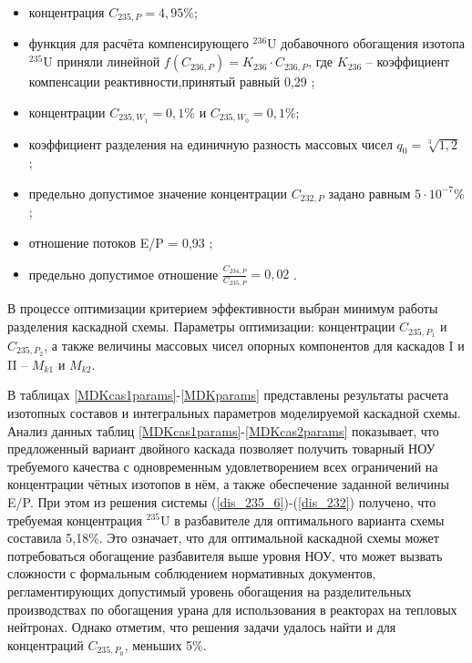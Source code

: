 \begin{itemize}
    \item концентрация $C_{235,{P}} = {4,95\%}$; 
    \item функция для расчёта компенсирующего $^{236}$U добавочного обогащения изотопа $^{235}$U приняли линейной $f(C_{236,P}) = {K_{236}\cdot{C_{236,{P}}}}$, где $K_{236}$ -- коэффициент компенсации реактивности,принятый равный 0,29 \cite{smirnovEvolutionIsotopicComposition2012};
    \item концентрации $C_{235,{W_1}} = 0,1\%$ и $C_{235,{W_0}} = 0,1\%$;
    \item коэффициент разделения на единичную разность массовых чисел $q_{0} = \sqrt[3]{1,2}$ \cite{smirnovEvolutionIsotopicComposition2012};
    \item предельно допустимое значение концентрации $C_{232,{P}}$ задано равным $5\cdot10^{-7} \%$;
    \item отношение потоков E/P = 0,93 \cite{smirnovObogashchenieRegenerirovannogoUrana2018};
    \item предельно допустимое отношение $\frac{C_{234,{P}}}{C_{235,{P}}} = 0,02$ \cite{smirnovObogashchenieRegenerirovannogoUrana2018}. 
\end{itemize}

В процессе оптимизации критерием эффективности выбран минимум работы разделения каскадной схемы. Параметры оптимизации: концентрации $C_{235,{P_1}}$ и $C_{235,{P_2}}$, а также величины массовых чисел опорных компонентов для каскадов I и II -- $M_{k1}$ и $M_{k2}$. 

В таблицах \ref{MDKcas1params}-\ref{MDKparams} представлены результаты расчета изотопных составов и интегральных параметров моделируемой каскадной схемы. Анализ данных таблиц \ref{MDKcas1params}-\ref{MDKcas2params} показывает, что предложенный вариант двойного каскада позволяет получить товарный НОУ требуемого качества с одновременным удовлетворением всех ограничений на концентрации чётных изотопов в нём, а также обеспечение заданной величины E/P. При этом из решения системы (\ref{dis_235_6})-(\ref{dis_232}) получено, что требуемая концентрация $^{235}$U в разбавителе для оптимального варианта схемы составила 5,18\%. Это означает, что для оптимальной каскадной схемы может потребоваться обогащение разбавителя выше уровня НОУ, что может вызвать сложности с формальным соблюдением нормативных документов, регламентирующих допустимый уровень обогащения на разделительных производствах по обогащения урана для использования в реакторах на тепловых нейтронах. Однако отметим, что решения задачи удалось найти и для концентраций $C_{235,{P_0}}$, меньших 5\%.

